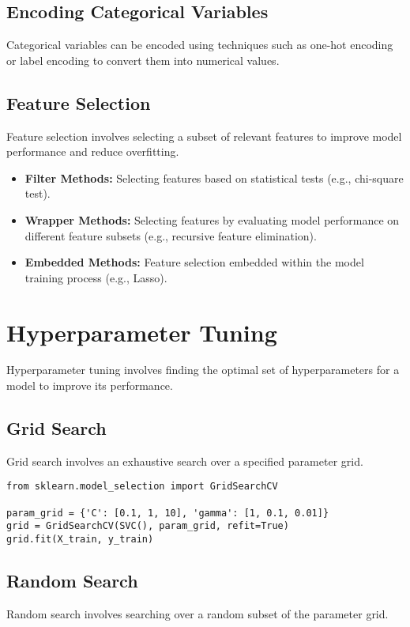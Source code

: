 \subsection{Encoding Categorical Variables}
Categorical variables can be encoded using techniques such as one-hot encoding or label encoding to convert them into numerical values.

\subsection{Feature Selection}
Feature selection involves selecting a subset of relevant features to improve model performance and reduce overfitting.

\begin{itemize}
    \item \textbf{Filter Methods:} Selecting features based on statistical tests (e.g., chi-square test).
    \item \textbf{Wrapper Methods:} Selecting features by evaluating model performance on different feature subsets (e.g., recursive feature elimination).
    \item \textbf{Embedded Methods:} Feature selection embedded within the model training process (e.g., Lasso).
\end{itemize}

\section{Hyperparameter Tuning}
Hyperparameter tuning involves finding the optimal set of hyperparameters for a model to improve its performance.

\subsection{Grid Search}
Grid search involves an exhaustive search over a specified parameter grid.

\begin{verbatim}
from sklearn.model_selection import GridSearchCV

param_grid = {'C': [0.1, 1, 10], 'gamma': [1, 0.1, 0.01]}
grid = GridSearchCV(SVC(), param_grid, refit=True)
grid.fit(X_train, y_train)
\end{verbatim}

\subsection{Random Search}
Random search involves searching over a random subset of the parameter grid.

